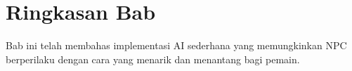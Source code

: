 \section{Ringkasan Bab}

Bab ini telah membahas implementasi AI sederhana yang memungkinkan NPC berperilaku dengan cara yang menarik dan menantang bagi pemain.
